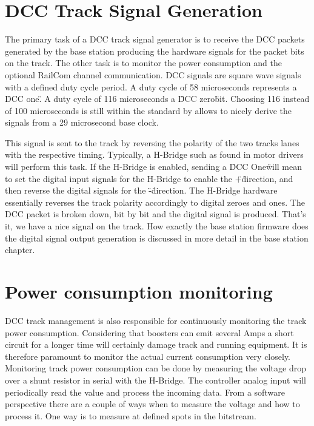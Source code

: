\section{DCC Track Signal Generation}

The primary task of a DCC track signal generator is to receive the DCC packets generated by the base station producing the hardware signals for the packet bits on the track. The other task is to monitor the power consumption and the optional RailCom channel communication. DCC signals are square wave signals with a defined duty cycle period. A duty cycle of 58 microseconds represents a \"DCC one\". A duty cycle of 116 microseconds a \"DCC zero\" bit. Choosing 116 instead of 100 microseconds is still within the standard by allows to nicely derive the signals from a 29 microsecond base clock. 

This signal is sent to the track by reversing the polarity of the two tracks lanes with the respective timing. Typically, a H-Bridge such as found in motor drivers will perform this task. If the H-Bridge is enabled, sending a \"DCC One\" will mean to set the digital input signals for the H-Bridge to enable the \"+\" direction, and then reverse the digital signals for the \"-\" direction. The H-Bridge hardware essentially reverses the track polarity accordingly to digital zeroes and ones. The DCC packet is broken down, bit by bit and the digital signal is produced.  That's it, we have a nice signal on the track. How exactly the base station firmware does the digital signal output generation is discussed in more detail in the base station chapter.

\section{Power consumption monitoring}

DCC track management is also responsible for continuously monitoring the track power consumption. Considering that boosters can emit several Amps a short circuit for a longer time will certainly damage track and running equipment. It is therefore paramount to monitor the actual current consumption very closely. Monitoring track power consumption can be done by measuring the voltage drop over a shunt resistor in serial with the H-Bridge. The controller analog input will periodically read the value and process the incoming data. From a software perspective there are a couple of ways when to measure the voltage and how to process it. One way is to measure at defined spots in the bitstream.

